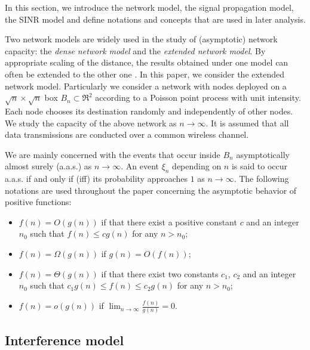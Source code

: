 \documentclass[english]{IEEEtran}
\theoremstyle{plain}
\theoremstyle{plain}
\theoremstyle{plain}
\theoremstyle{remark}
\begin{document}
In this section, we introduce the network model, the signal propagation
model, the SINR model and define notations and concepts that are used
in later analysis.

Two network models are widely used in the study of (asymptotic) network
capacity: the \emph{dense network model} and the \emph{extended network
model}. By appropriate scaling of the distance, the results obtained
under one model can often be extended to the other one \cite{Franceschetti07Random}.
In this paper, we consider the extended network model. Particularly
we consider a network with nodes deployed on a $\sqrt{n}\times\sqrt{n}$
box $B_{n}\subset\Re^{2}$ according to a Poisson point process with
unit intensity. Each node chooses its destination randomly and independently
of other nodes. We study the capacity of the above network as $n\rightarrow\infty$.
It is assumed that all data transmissions are conducted over a common
wireless channel.

We are mainly concerned with the events that occur inside $B_{n}$
asymptotically almost surely (a.a.s.) as $n\rightarrow\infty$. An
event $\xi_{n}$ depending on $n$ is said to occur a.a.s. if and
only if (iff) its probability approaches $1$ as $n\rightarrow\infty$.
The following notations are used throughout the paper concerning the
asymptotic behavior of positive functions:
\begin{itemize}
\item $f\left(n\right)=O\left(g\left(n\right)\right)$ if that there exist
a positive constant $c$ and an integer $n_{0}$ such that $f\left(n\right)\leq cg\left(n\right)$
for any $n>n_{0}$;
\item $f\left(n\right)=\Omega\left(g\left(n\right)\right)$ if $g\left(n\right)=O\left(f\left(n\right)\right)$;
\item $f\left(n\right)=\Theta\left(g\left(n\right)\right)$ if that there
exist two constants $c_{1}$, $c_{2}$ and an integer $n_{0}$ such
that $c_{1}g\left(n\right)\leq f\left(n\right)\leq c_{2}g\left(n\right)$
for any $n>n_{0}$;
\item $f\left(n\right)=o\left(g\left(n\right)\right)$ if ${\displaystyle \lim_{n\rightarrow\infty}}\frac{f\left(n\right)}{g\left(n\right)}=0$.
\end{itemize}

\subsection{Interference model\label{sub:Interference-model}}
\end{document}
